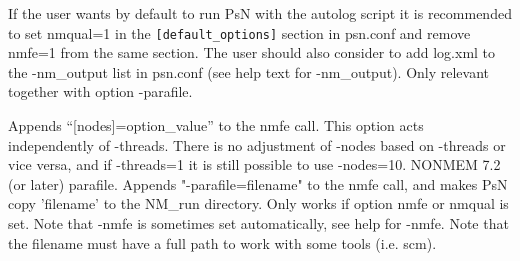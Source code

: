 \begin{optionlist}
If the user wants by default to run PsN with the autolog script it is recommended to set nmqual=1 in the 
\verb|[default_options]| section in psn.conf and remove nmfe=1 from the same section. The user should also consider to add log.xml to the -nm\_output list in psn.conf (see help text for -nm\_output).
\nextopt
{}
Only relevant together with option -parafile. 

Appends “[nodes]=option\_value” to the nmfe call. This option acts independently of -threads. There is no adjustment of -nodes based on -threads or vice versa, and if -threads=1 it is still possible to use -nodes=10. 
\nextopt
{}
    NONMEM 7.2 (or later) parafile. Appends "-parafile=filename"
    to the nmfe call, and makes PsN copy 'filename' to the NM\_run directory.
    Only works if option nmfe or nmqual is set. Note that -nmfe is sometimes set 
    automatically, see help for -nmfe.
    Note that the filename must have a full path to work with some tools (i.e. scm).
\nextopt
\end{optionlist}
